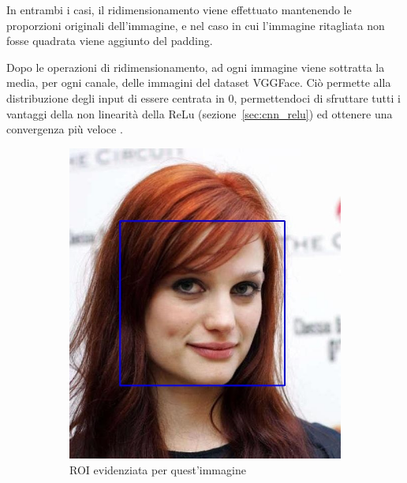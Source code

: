 In entrambi i casi, il ridimensionamento viene effettuato mantenendo le proporzioni originali dell'immagine, e nel caso in cui l'immagine ritagliata non fosse quadrata viene aggiunto del padding. 

Dopo le operazioni di ridimensionamento, ad ogni immagine viene sottratta la media, per ogni canale, delle immagini del dataset VGGFace. Ciò permette alla distribuzione degli input di essere centrata in $0$, permettendoci di sfruttare tutti i vantaggi della non linearità della ReLu (sezione~\ref{sec:cnn_relu}) ed ottenere una convergenza più veloce \cite{miviaage}.

\begin{figure}[ht]
\centering
\begin{subfigure}{0.3\textwidth}
\includegraphics[width=\textwidth]{./Images/detection.jpg}
\caption{ROI evidenziata per quest'immagine}
\label{sfig:detection}
\end{subfigure}
\hspace{0.1\textwidth}
\begin{subfigure}{0.3\textwidth}

\end{subfigure}
\end{figure}
